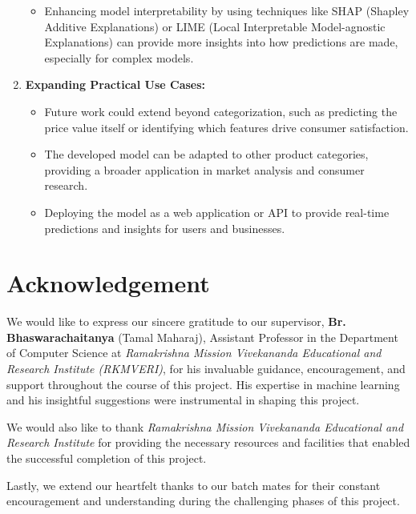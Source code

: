 \documentclass[12pt]{report}
\begin{document}
\begin{enumerate}
	      \begin{itemize}
		      \setlength\itemsep{-1.5em}
		      \item Enhancing model interpretability by using techniques like SHAP (Shapley Additive Explanations) or LIME (Local Interpretable Model-agnostic Explanations) can provide more insights into how predictions are made, especially for complex models.
	      \end{itemize}
	\item{\textbf{Expanding Practical Use Cases:	}}
	      \vspace{-1.65em}
	      \begin{itemize}
		      \setlength\itemsep{-1.5em}
		      \item Future work could extend beyond categorization, such as predicting the price value itself or identifying which features drive consumer satisfaction.
		      \item The developed model can be adapted to other product categories, providing a broader application in market analysis and consumer research.
		      \item Deploying the model as a web application or API to provide real-time predictions and insights for users and businesses.
	      \end{itemize}
\end{enumerate}

\chapter*{Acknowledgement}

We would like to express our sincere gratitude to our supervisor, \textbf{Br. Bhaswarachaitanya} (Tamal Maharaj), Assistant Professor in the Department of Computer Science at \textit{Ramakrishna Mission Vivekananda Educational and Research Institute (RKMVERI)}, for his invaluable guidance, encouragement, and support throughout the course of this project. His expertise in machine learning and his insightful suggestions were instrumental in shaping this project.

We would also like to thank \textit{Ramakrishna Mission Vivekananda Educational and Research Institute} for providing the necessary resources and facilities that enabled the successful completion of this project.

Lastly, we extend our heartfelt thanks to our batch mates for their constant encouragement and understanding during the challenging phases of this project.
\end{document}
